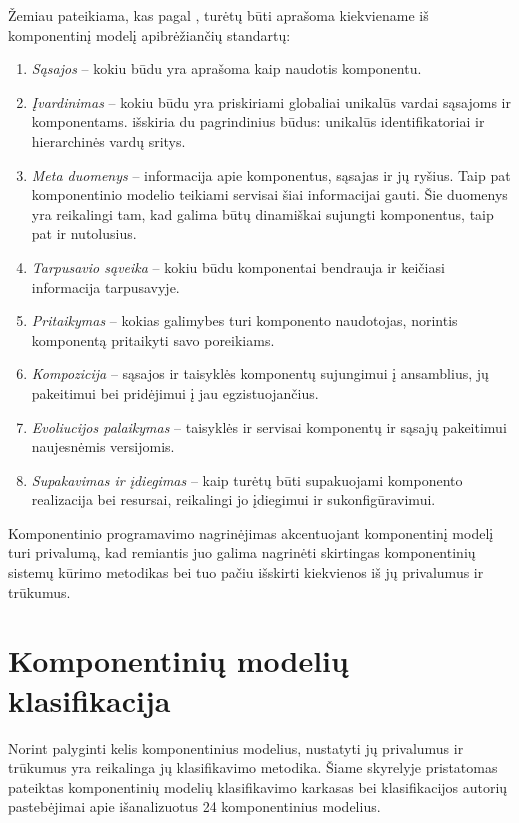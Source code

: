 Žemiau pateikiama, kas pagal \cite[37]{heineman2001component}, turėtų
būti aprašoma kiekviename iš komponentinį modelį apibrėžiančių standartų:
\begin{enumerate}
  \item \emph{Sąsajos} – kokiu būdu yra aprašoma kaip naudotis
    komponentu.
  \item \emph{Įvardinimas} – kokiu būdu yra priskiriami globaliai
    unikalūs vardai sąsajoms ir komponentams.
    \cite[40]{heineman2001component} išskiria du pagrindinius būdus:
    unikalūs identifikatoriai ir hierarchinės vardų sritys.
  \item \emph{Meta duomenys} – informacija apie komponentus, sąsajas
    ir jų ryšius. Taip pat komponentinio modelio teikiami servisai
    šiai informacijai gauti. Šie duomenys yra reikalingi tam, kad
    galima būtų dinamiškai sujungti komponentus, taip pat ir
    nutolusius.
  \item \emph{Tarpusavio sąveika} – kokiu būdu komponentai bendrauja
    ir keičiasi informacija tarpusavyje.
  \item \emph{Pritaikymas} – kokias galimybes turi komponento naudotojas,
    norintis komponentą pritaikyti savo poreikiams.
  \item \emph{Kompozicija} – sąsajos ir taisyklės komponentų
    sujungimui į ansamblius, jų pakeitimui bei pridėjimui į jau
    egzistuojančius.
  \item \emph{Evoliucijos palaikymas} – taisyklės ir servisai
    komponentų ir sąsajų pakeitimui naujesnėmis versijomis.
  \item \emph{Supakavimas ir įdiegimas} – kaip turėtų būti supakuojami
    komponento realizacija bei resursai, reikalingi jo įdiegimui
    ir sukonfigūravimui.
\end{enumerate}

Komponentinio programavimo nagrinėjimas akcentuojant komponentinį modelį
turi privalumą, kad remiantis juo galima nagrinėti skirtingas
komponentinių sistemų kūrimo metodikas bei tuo pačiu išskirti
kiekvienos iš jų privalumus ir trūkumus.

\section{Komponentinių modelių klasifikacija}

\label{section:component:model:classification}

Norint palyginti kelis komponentinius modelius, nustatyti jų privalumus
ir trūkumus yra reikalinga jų klasifikavimo metodika. Šiame skyrelyje
pristatomas \cite{classification-framework-for-scm} pateiktas
komponentinių modelių klasifikavimo karkasas bei klasifikacijos
autorių pastebėjimai apie išanalizuotus 24 komponentinius modelius.

